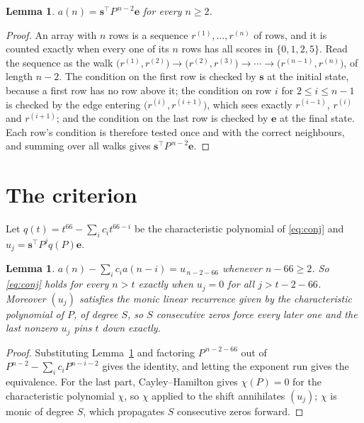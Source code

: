 \documentclass[11pt,a4paper]{article}
\theoremstyle{plain}
\newtheorem{lemma}[theorem]{Lemma}
\theoremstyle{definition}
\begin{document}
\begin{lemma}\label{lem:walk}
$a(n)=\mathbf{s}^{\!\top}P^{\,n-2}\mathbf{e}$ for every $n\ge2$.
\end{lemma}

\begin{proof}
An array with $n$ rows is a sequence $r^{(1)},\dots,r^{(n)}$ of rows, and it is counted
exactly when every one of its $n$ rows has all scores in $\{0,1,2,5\}$. Read the sequence as the
walk $\bigl(r^{(1)},r^{(2)}\bigr)\to\bigl(r^{(2)},r^{(3)}\bigr)\to\cdots\to
\bigl(r^{(n-1)},r^{(n)}\bigr)$, of length $n-2$. The condition on the first row is
checked by $\mathbf{s}$ at the initial state, because a first row has no row above it; the
condition on row $i$ for $2\le i\le n-1$ is checked by the edge entering
$\bigl(r^{(i)},r^{(i+1)}\bigr)$, which sees exactly $r^{(i-1)}$, $r^{(i)}$ and
$r^{(i+1)}$; and the condition on the last row is checked by $\mathbf{e}$ at the final
state. Each row's condition is therefore tested once and with the correct neighbours, and
summing over all walks gives $\mathbf{s}^{\!\top}P^{\,n-2}\mathbf{e}$.
\end{proof}

\section{The criterion}

Let $q(t)=t^{66}-\sum_i c_i t^{66-i}$ be the characteristic polynomial of
\eqref{eq:conj} and $u_j=\mathbf{s}^{\!\top}P^{j}q(P)\mathbf{e}$.

\begin{lemma}\label{lem:crit}
$a(n)-\sum_i c_i a(n-i)=u_{\,n-2-66}$ whenever $n-66\ge2$. So \eqref{eq:conj}
holds for every $n>t$ exactly when $u_j=0$ for all $j>t-2-66$. Moreover $(u_j)$
satisfies the monic linear recurrence given by the characteristic polynomial of $P$, of
degree $S$, so $S$ consecutive zeros force every later one and the last nonzero $u_j$ pins
$t$ down exactly.
\end{lemma}

\begin{proof}
Substituting Lemma~\ref{lem:walk} and factoring $P^{\,n-2-66}$ out of
$P^{n-2}-\sum_i c_i P^{n-i-2}$ gives the identity, and letting the exponent run gives the
equivalence. For the last part, Cayley--Hamilton gives $\chi(P)=0$ for the characteristic
polynomial $\chi$, so $\chi$ applied to the shift annihilates $(u_j)$; $\chi$ is monic of
degree $S$, which propagates $S$ consecutive zeros forward.
\end{proof}
\end{document}
